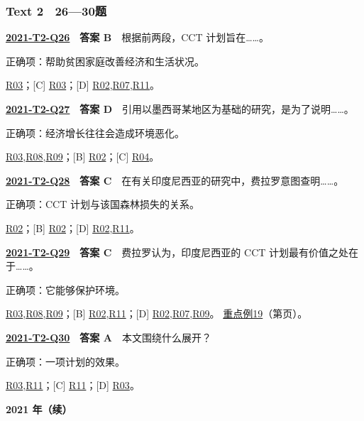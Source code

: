 \documentclass[11pt,a4paper]{article}
\begin{document}
\subsubsection{Text 2　26—30题}
\label{idx-2021-T2-Q26}
\noindent\textbf{\href{https://zj139.github.io/math-notes/english/b002297fb20aa6c5b4babd05/\#q26}{2021-T2-Q26}　答案 B}　根据前两段，CCT 计划旨在……。\par\nopagebreak
\noindent 正确项：帮助贫困家庭改善经济和生活状况。\par\nopagebreak
\noindent [A] \hyperref[cat-R03]{R03}；[C] \hyperref[cat-R03]{R03}；[D] \hyperref[cat-R02]{R02},\hyperref[cat-R07]{R07},\hyperref[cat-R11]{R11}。
\par\smallskip
{}\label{idx-2021-T2-Q27}
\noindent\textbf{\href{https://zj139.github.io/math-notes/english/b002297fb20aa6c5b4babd05/\#q27}{2021-T2-Q27}　答案 D}　引用以墨西哥某地区为基础的研究，是为了说明……。\par\nopagebreak
\noindent 正确项：经济增长往往会造成环境恶化。\par\nopagebreak
\noindent [A] \hyperref[cat-R03]{R03},\hyperref[cat-R08]{R08},\hyperref[cat-R09]{R09}；[B] \hyperref[cat-R02]{R02}；[C] \hyperref[cat-R04]{R04}。
\par\smallskip
{}\label{idx-2021-T2-Q28}
\noindent\textbf{\href{https://zj139.github.io/math-notes/english/b002297fb20aa6c5b4babd05/\#q28}{2021-T2-Q28}　答案 C}　在有关印度尼西亚的研究中，费拉罗意图查明……。\par\nopagebreak
\noindent 正确项：CCT 计划与该国森林损失的关系。\par\nopagebreak
\noindent [A] \hyperref[cat-R02]{R02}；[B] \hyperref[cat-R02]{R02}；[D] \hyperref[cat-R02]{R02},\hyperref[cat-R11]{R11}。
\par\smallskip
{}\label{idx-2021-T2-Q29}
\noindent\textbf{\href{https://zj139.github.io/math-notes/english/b002297fb20aa6c5b4babd05/\#q29}{2021-T2-Q29}　答案 C}　费拉罗认为，印度尼西亚的 CCT 计划最有价值之处在于……。\par\nopagebreak
\noindent 正确项：它能够保护环境。\par\nopagebreak
\noindent [A] \hyperref[cat-R03]{R03},\hyperref[cat-R08]{R08},\hyperref[cat-R09]{R09}；[B] \hyperref[cat-R02]{R02},\hyperref[cat-R11]{R11}；[D] \hyperref[cat-R02]{R02},\hyperref[cat-R07]{R07},\hyperref[cat-R09]{R09}。
\hyperref[case-2021-T2-Q29]{重点例19}（第\pageref{case-2021-T2-Q29}页）。
\par\smallskip
{}\label{idx-2021-T2-Q30}
\noindent\textbf{\href{https://zj139.github.io/math-notes/english/b002297fb20aa6c5b4babd05/\#q30}{2021-T2-Q30}　答案 A}　本文围绕什么展开？\par\nopagebreak
\noindent 正确项：一项计划的效果。\par\nopagebreak
\noindent [B] \hyperref[cat-R03]{R03},\hyperref[cat-R11]{R11}；[C] \hyperref[cat-R11]{R11}；[D] \hyperref[cat-R03]{R03}。
\par\smallskip
\clearpage\noindent\textbf{2021 年（续）}\par
\end{document}
